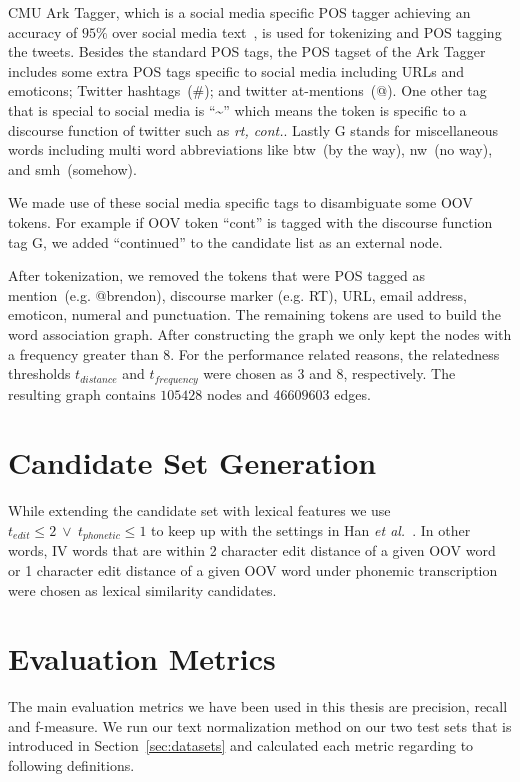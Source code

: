 \documentclass[a4paper,onesided,12pt]{report}
\begin{document}
CMU Ark Tagger, which is a social media specific POS tagger achieving an accuracy of $95\%$ over social media text~\cite{owoputi2013improved,Gimpel:2011:PTT:2002736.2002747}, is used for tokenizing and POS tagging the tweets. Besides the standard POS tags, the POS tagset of the Ark Tagger includes some extra POS tags specific to social media including URLs and emoticons; Twitter hashtags~(\#); and twitter at-mentions~(@). One other tag that is special to social media is ``\textasciitilde'' which means the token is specific to a discourse function of twitter such as \textit{rt, cont.}. Lastly G stands for miscellaneous words including multi word abbreviations like btw~(by the way), nw~(no way), and smh~(somehow).

We made use of these social media specific tags to disambiguate some OOV tokens. For example if OOV token ``cont'' is tagged with the discourse function tag G, we added ``continued'' to the candidate list as an external node.

After tokenization, we removed the tokens that were POS tagged as mention~(e.g. @brendon), discourse marker (e.g. RT), URL, email address, emoticon, numeral and punctuation. The remaining tokens are used to build the word association graph. After constructing the graph we only kept the nodes with a frequency greater than $8$. For the performance related reasons, the relatedness thresholds $t_{distance}$ and $t_{frequency}$  were chosen as $3$ and $8$, respectively. The resulting graph contains $105428$ nodes and $46609603$ edges.

\section{Candidate Set Generation}

While extending the candidate set with lexical features we use ${t_{edit}\leq 2}~\vee~{t_{phonetic} \leq 1}$ to keep up with the settings in Han \textit{et al.}~\cite{Han:2011:LNS:2002472.2002520}. In other words, IV words that are within 2 character edit distance of a given OOV word or 1 character edit distance of a given OOV word under phonemic transcription were chosen as lexical similarity candidates.

\section{Evaluation Metrics}

The main evaluation metrics we have been used in this thesis are precision, recall and f-measure. We run our text normalization method on our two test sets that is introduced in Section~\ref{sec:datasets} and calculated each metric regarding to following definitions.
\end{document}
